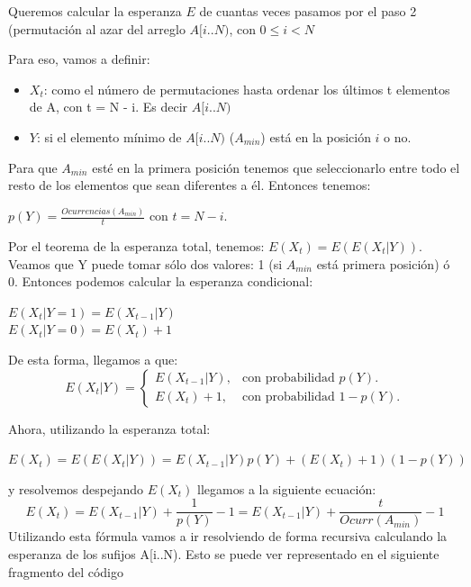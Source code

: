 \documentclass[a4paper]{article}
\begin{document}
Queremos calcular la esperanza $E$ de cuantas veces pasamos por el paso 2 (permutación al azar del arreglo $A[i..N)$, con $0 \leq i < N$  

Para eso, vamos a definir: 
\begin{itemize}
	\item $X_t$: como el número de permutaciones hasta ordenar los últimos t elementos de A, con t = N - i. Es decir $A[i..N)$ 
    \item $Y$: si el elemento mínimo de $A[i..N)$ ($A_{min}$) está en la posición $i$ o no.
\end{itemize} 

Para que $A_{min}$ esté en la primera posición tenemos que seleccionarlo entre todo el resto de los elementos que sean diferentes a él. Entonces tenemos:
\begin{center}
$p(Y) = \frac{Ocurrencias(A_{min})}{t}$ con $t = N - i$.
\end{center}
Por el teorema de la esperanza total, tenemos: $E(X_t) = E(E(X_t|Y))$. Veamos que Y puede tomar sólo dos valores: 1 (si $A_{min}$ está primera posición) ó 0. Entonces podemos calcular la esperanza condicional: \\ 
\begin{center}
$E(X_t|Y=1) = E(X_{t-1}|Y)$ \\
$E(X_t|Y=0) = E(X_{t}) + 1$ 

\end{center}

De esta forma, llegamos a que:  
\begin{equation}
  \text{$E(X_t|Y)$}=\begin{cases}
    \text{$E(X_{t-1}|Y)$}, & \text{con probabilidad $p(Y)$}.\\
    \text{$E(X_t) + 1$}, & \text{con probabilidad $1 - p(Y)$}.
  \end{cases}
\end{equation}

  Ahora, utilizando la esperanza total:
  \begin{center}
  $E(X_t) = E(E(X_t|Y)) = E(X_{t-1}|Y)p(Y) + (E(X_t) + 1)(1-p(Y))$ 
  \end{center}
  y resolvemos despejando $E(X_t)$ llegamos a la siguiente ecuación: 
  \begin{equation}
  E(X_t) = E(X_{t-1}|Y) + \frac{1}{p(Y)} - 1 = E(X_{t-1}|Y) + \frac{t}{Ocurr(A_{min})} - 1
  \end{equation}
  Utilizando esta fórmula vamos a ir resolviendo de forma recursiva calculando la esperanza de los sufijos A[i..N). Esto se puede ver representado en el siguiente fragmento del código
  
\end{document}
